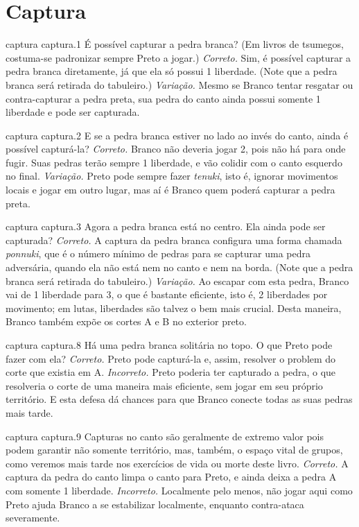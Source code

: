 \chapter{Captura}

\emptypage

\problemAnswerDiagram
  {captura}
  {captura.1}
  {É possível capturar a pedra branca? (Em livros de tsumegos, costuma-se padronizar sempre Preto a jogar.)}
  {\emph{Correto.} Sim, é possível capturar a pedra branca diretamente, já que ela só possui 1 liberdade. (Note que a pedra branca será retirada do tabuleiro.)}
  {\emph{Variação.} Mesmo se Branco tentar resgatar ou contra-capturar a pedra preta, sua pedra do canto ainda possui somente 1 liberdade e pode ser capturada.}
  
\problemAnswerDiagram
  {captura}
  {captura.2}
  {E se a pedra branca estiver no lado ao invés do canto, ainda é possível capturá-la?}
  {\emph{Correto.} Branco não deveria jogar 2, pois não há para onde fugir. Suas pedras terão sempre 1 liberdade, e vão colidir com o canto esquerdo no final.}
  {\emph{Variação.} Preto pode sempre fazer \emph{tenuki}, isto é, ignorar movimentos locais e jogar em outro lugar, mas aí é Branco quem poderá capturar a pedra preta.}

\problemAnswerDiagram
  {captura}
  {captura.3}
  {Agora a pedra branca está no centro. Ela ainda pode ser capturada?}
  {\emph{Correto.} A captura da pedra branca configura uma forma chamada \emph{ponnuki}, que é o número mínimo de pedras para se capturar uma pedra adversária, quando ela não está nem no canto e nem na borda. (Note que a pedra branca será retirada do tabuleiro.)}
  {\emph{Variação.} Ao escapar com esta pedra, Branco vai de 1 liberdade para 3, o que é bastante eficiente, isto é, 2 liberdades por movimento; em lutas, liberdades são talvez o bem mais crucial. Desta maneira, Branco também expõe os cortes A e B no exterior preto.}

\problemAnswerDiagram
  {captura}
  {captura.8}
  {Há uma pedra branca solitária no topo. O que Preto pode fazer com ela?}
  {\emph{Correto.} Preto pode capturá-la e, assim, resolver o problem do corte que existia em A.}
  {\emph{Incorreto.} Preto poderia ter capturado a pedra, o que resolveria o corte de uma maneira mais eficiente, sem jogar em seu próprio território. E esta defesa dá chances para que Branco conecte todas as suas pedras mais tarde.}

\problemAnswerDiagram
  {captura}
  {captura.9}
  {Capturas no canto são geralmente de extremo valor pois podem garantir não somente território, mas, também, o espaço vital de grupos, como veremos mais tarde nos exercícios de vida ou morte deste livro.}
  {\emph{Correto.} A captura da pedra do canto limpa o canto para Preto, e ainda deixa a pedra A com somente 1 liberdade.}
  {\emph{Incorreto.} Localmente pelo menos, não jogar aqui como Preto ajuda Branco a se estabilizar localmente, enquanto contra-ataca severamente.}

